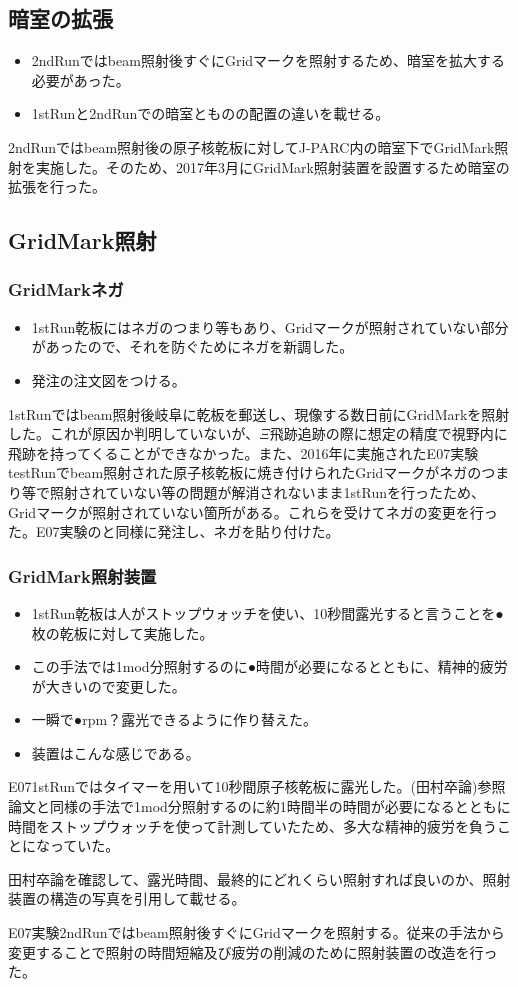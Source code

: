 \documentclass[12pt,a4paper]{jarticle}
\begin{document}
\subsection{暗室の拡張}
\begin{itemize}
 \item 2ndRunではbeam照射後すぐにGridマークを照射するため、暗室を拡大する必要があった。
 \item 1stRunと2ndRunでの暗室とものの配置の違いを載せる。
\end{itemize}
2ndRunではbeam照射後の原子核乾板に対してJ-PARC内の暗室下でGridMark照射を実施した。そのため、2017年3月にGridMark照射装置を設置するため暗室の拡張を行った。\par
\subsection{GridMark照射}
\subsubsection{GridMarkネガ}
\begin{itemize}
 \item 1stRun乾板にはネガのつまり等もあり、Gridマークが照射されていない部分があったので、それを防ぐためにネガを新調した。
 \item 発注の注文図をつける。
\end{itemize}
1stRunではbeam照射後岐阜に乾板を郵送し、現像する数日前にGridMarkを照射した。これが原因か判明していないが、$\Xi$飛跡追跡の際に想定の精度で視野内に飛跡を持ってくることができなかった。また、2016年に実施されたE07実験testRunでbeam照射された原子核乾板に焼き付けられたGridマークがネガのつまり等で照射されていない等の問題が解消されないまま1stRunを行ったため、Gridマークが照射されていない箇所がある。これらを受けてネガの変更を行った。E07実験のと同様に発注し、ネガを貼り付けた。
\subsubsection{GridMark照射装置}
\begin{itemize}
 \item 1stRun乾板は人がストップウォッチを使い、10秒間露光すると言うことを●枚の乾板に対して実施した。
 \item この手法では1mod分照射するのに●時間が必要になるとともに、精神的疲労が大きいので変更した。
 \item 一瞬で●rpm？露光できるように作り替えた。
 \item 装置はこんな感じである。
\end{itemize}
E071stRunではタイマーを用いて10秒間原子核乾板に露光した。(田村卒論)参照論文と同様の手法で1mod分照射するのに約1時間半の時間が必要になるとともに時間をストップウォッチを使って計測していたため、多大な精神的疲労を負うことになっていた。\par
田村卒論を確認して、露光時間、最終的にどれくらい照射すれば良いのか、照射装置の構造の写真を引用して載せる。\par
E07実験2ndRunではbeam照射後すぐにGridマークを照射する。従来の手法から変更することで照射の時間短縮及び疲労の削減のために照射装置の改造を行った。
\end{document}
